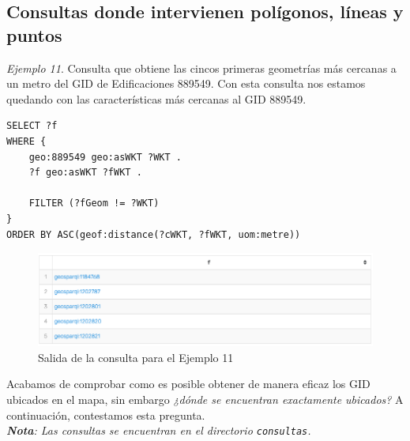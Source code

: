 \subsection{Consultas donde intervienen polígonos, líneas y puntos}


\textit{Ejemplo 11}. Consulta que obtiene las cincos primeras geometrías más cercanas a un metro del GID de Edificaciones 889549. Con esta consulta nos estamos quedando con las características más cercanas al GID 889549.


\vspace*{0.2cm}

\begin{lstlisting}
SELECT ?f
WHERE {
	geo:889549 geo:asWKT ?WKT .
	?f geo:asWKT ?fWKT .
	
	FILTER (?fGeom != ?WKT)
}
ORDER BY ASC(geof:distance(?cWKT, ?fWKT, uom:metre))

\end{lstlisting}

\begin{figure}[H]
	\centering
	\includegraphics[width=1\linewidth]{imagenes/capitulo5/salida8}
	\caption{Salida de la consulta para el Ejemplo 11}
	\label{fig:salida8}
\end{figure}




Acabamos de comprobar como es posible obtener de manera eficaz los GID ubicados en el mapa, sin embargo \textit{¿dónde se encuentran exactamente ubicados?} A continuación, contestamos esta pregunta.\\


\textit{\textbf{Nota}: Las consultas se encuentran en el directorio \texttt{consultas}.}






